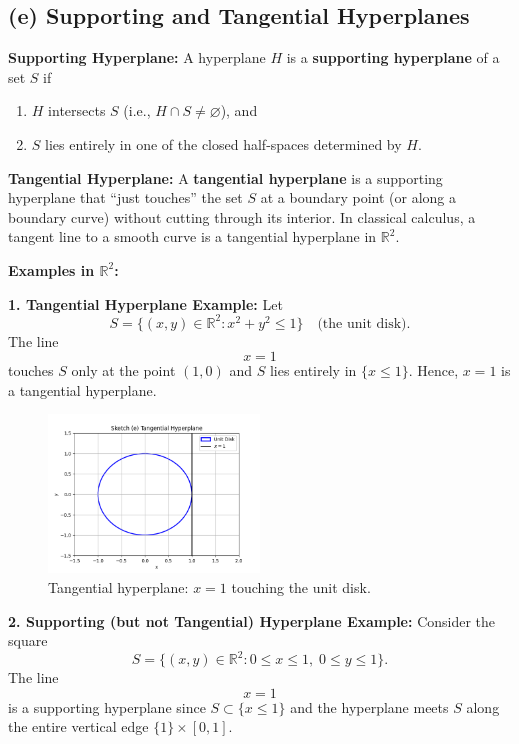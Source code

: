 \documentclass{article}
\begin{document}
\subsection*{(e) Supporting and Tangential Hyperplanes}

\textbf{Supporting Hyperplane:} A hyperplane $H$ is a \textbf{supporting hyperplane} of a set $S$ if 
\begin{enumerate}
    \item $H$ intersects $S$ (i.e., $H \cap S \neq \varnothing$), and 
    \item $S$ lies entirely in one of the closed half-spaces determined by $H$.
\end{enumerate}

\medskip
\textbf{Tangential Hyperplane:} A \textbf{tangential hyperplane} is a supporting hyperplane that ``just touches'' the set $S$ at a boundary point (or along a boundary curve) without cutting through its interior. In classical calculus, a tangent line to a smooth curve is a tangential hyperplane in $\mathbb{R}^2$.

\medskip
\textbf{Examples in $\mathbb{R}^2$:}

\medskip
\textbf{1. Tangential Hyperplane Example:}  
Let 
\[
S = \{(x,y) \in \mathbb{R}^2 : x^2+y^2 \le 1\} \quad \text{(the unit disk)}.
\]
The line 
\[
x = 1
\]
touches $S$ only at the point $(1,0)$ and $S$ lies entirely in $\{x \le 1\}$. Hence, $x=1$ is a tangential hyperplane.

\begin{figure}[H]
    \centering
    \includegraphics[width=0.5\textwidth]{e_tangent.png}
    \caption{Tangential hyperplane: $x=1$ touching the unit disk.}
\end{figure}

\medskip
\textbf{2. Supporting (but not Tangential) Hyperplane Example:}  
Consider the square
\[
S = \{(x,y) \in \mathbb{R}^2 : 0 \le x \le 1,\; 0 \le y \le 1\}.
\]
The line 
\[
x = 1
\]
is a supporting hyperplane since $S \subset \{x \le 1\}$ and the hyperplane meets $S$ along the entire vertical edge $\{1\} \times [0,1]$.
\end{document}
